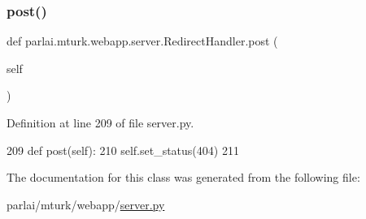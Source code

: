 \subsubsection{\texorpdfstring{post()}{post()}}
{\footnotesize\ttfamily def parlai.\+mturk.\+webapp.\+server.\+Redirect\+Handler.\+post (\begin{DoxyParamCaption}\item[{}]{self }\end{DoxyParamCaption})}



Definition at line 209 of file server.\+py.


\begin{DoxyCode}
209     \textcolor{keyword}{def }post(self):
210         self.set\_status(404)
211 
\end{DoxyCode}


The documentation for this class was generated from the following file\+:\begin{DoxyCompactItemize}
\item 
parlai/mturk/webapp/\hyperlink{server_8py}{server.\+py}\end{DoxyCompactItemize}
